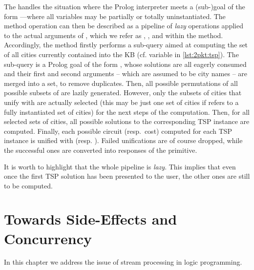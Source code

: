 \documentclass[12pt,a4paper,openright,twoside]{book}
\begin{document}
The  handles the situation where the Prolog interpreter meets a (sub-)goal of the form ---where all variables may be partially or totally uninstantiated.
%
The method operation can then be described as a pipeline of \emph{lazy} operations applied to the actual arguments of , which we refer as , , and  within the method.
%
Accordingly, the method firstly performs a sub-query aimed at computing the set of all cities currently contained into the KB (cf. variable  in \cref{lst:2pkt:tsp}).
%
The sub-query is a Prolog goal of the form , whose solutions are all eagerly consumed and their first and second arguments -- which are assumed to be city names -- are merged into a set, to remove duplicates.
%
Then, all possible permutations of all possible subsets of  are lazily generated.
%
However, only the subsets of cities that unify with  are actually selected (this may be just one set of cities if  refers to a fully instantiated set of cities) for the next steps of the computation.
%
Then, for all selected sets of cities, all possible solutions to the corresponding TSP instance are computed.
%
Finally, each possible circuit (resp.\ cost) computed for each TSP instance is unified with  (resp. ).
%
Failed unifications are of course dropped, while the successful ones are converted into responses of the  primitive.

It is worth to highlight that the whole pipeline is \emph{lazy}.
%
This implies that even once the first TSP solution has been presented to the user, the other ones are still to be computed.

\section{Towards Side-Effects and Concurrency}


In this chapter we address the issue of stream processing in logic programming.
\end{document}
